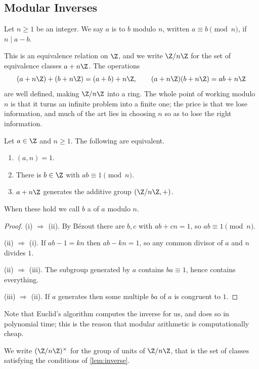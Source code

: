 \subsection{Modular Inverses}

\begin{definition}
	Let $n \geq 1$ be an integer. We say $a$ is  to $b$ modulo $n$, written $a \equiv b \pmod n$, if $n \mid a - b$.
\end{definition}

This is an equivalence relation on $\Z$, and we write $\Z/n\Z$ for the set of equivalence classes $a + n\Z$. The operations
$$
(a + n\Z) + (b + n\Z) = (a + b) + n\Z, \qquad (a + n\Z)(b + n\Z) = ab + n\Z
$$
are well defined, making $\Z/n\Z$ into a ring. The whole point of working modulo $n$ is that it turns an infinite problem into a finite one; the price is that we lose information, and much of the art lies in choosing $n$ so as to lose the right information.

\begin{lemma}\label{lem:inverse}
	Let $a \in \Z$ and $n \geq 1$. The following are equivalent.
	\begin{enumerate}[label=(\roman*)]
		\item $(a, n) = 1$.
		\item There is $b \in \Z$ with $ab \equiv 1 \pmod n$.
		\item $a + n\Z$ generates the additive group $(\Z/n\Z, +)$.
	\end{enumerate}
	When these hold we call $b$ a  of $a$ modulo $n$.
\end{lemma}
\begin{proof}
	(i) $\Rightarrow$ (ii). By Bézout there are $b, c$ with $ab + cn = 1$, so $ab \equiv 1 \pmod n$.

	(ii) $\Rightarrow$ (i). If $ab - 1 = kn$ then $ab - kn = 1$, so any common divisor of $a$ and $n$ divides $1$.

	(ii) $\Rightarrow$ (iii). The subgroup generated by $a$ contains $ba \equiv 1$, hence contains everything.

	(iii) $\Rightarrow$ (ii). If $a$ generates then some multiple $ba$ of $a$ is congruent to $1$.
\end{proof}

Note that Euclid's algorithm computes the inverse for us, and does so in polynomial time; this is the reason that modular arithmetic is computationally cheap.

\begin{definition}
	We write $(\Z/n\Z)^\times$ for the group of units of $\Z/n\Z$, that is the set of classes satisfying the conditions of \autoref{lem:inverse}.
\end{definition}

